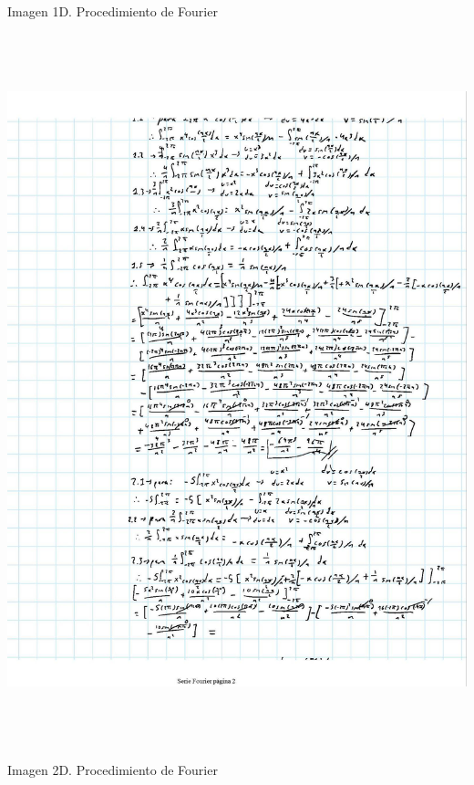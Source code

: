 Imagen 1D. Procedimiento de Fourier

\includegraphics[width=6.26772in,height=8.11111in]{media/image56.jpg}

Imagen 2D. Procedimiento de Fourier

